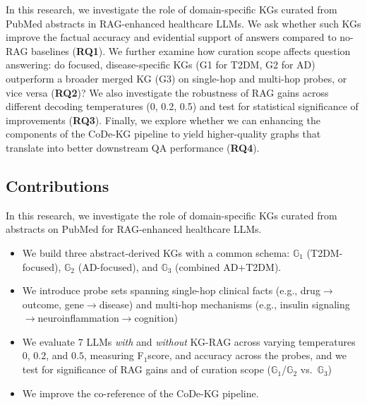 In this research, we investigate the role of domain-specific KGs curated from PubMed abstracts in RAG-enhanced healthcare LLMs. We ask whether such KGs improve the factual accuracy and evidential support of answers compared to no-RAG baselines (\textbf{RQ1}). We further examine how curation scope affects question answering: do focused, disease-specific KGs (G1 for T2DM, G2 for AD) outperform a broader merged KG (G3) on single-hop and multi-hop probes, or vice versa (\textbf{RQ2})? We also investigate the robustness of RAG gains across different decoding temperatures (0, 0.2, 0.5) and test for statistical significance of improvements (\textbf{RQ3}). Finally, we explore whether we can enhancing the components of the CoDe-KG pipeline to yield higher-quality graphs that translate into better downstream QA performance (\textbf{RQ4}).


% 

\subsection{Contributions}
In this research, we investigate the role of domain-specific KGs curated from abstracts on PubMed for RAG-enhanced healthcare LLMs. 
\begin{itemize}
    \item We build three abstract-derived KGs with a common schema: \textbf{$\mathbb{G}_1$} (T2DM-focused), \textbf{$\mathbb{G}_2$} (AD-focused), and \textbf{$\mathbb{G}_3$} (combined AD+T2DM).
   \item We introduce probe sets spanning single-hop clinical facts (e.g., drug$\rightarrow$outcome, gene$\rightarrow$disease) and multi-hop mechanisms (e.g., insulin signaling$\rightarrow$neuroinflammation$\rightarrow$cognition)
   \item We evaluate 7 LLMs \emph{with} and \emph{without} KG-RAG across varying temperatures $0$, $0.2$, and $0.5$, measuring F$_1$score, and accuracy across the probes, and we test for significance of RAG gains and of curation scope ($\mathbb{G}_1$/$\mathbb{G}_2$ vs.\ $\mathbb{G}_3$)
   \item We improve the co-reference of the CoDe-KG pipeline.
\end{itemize}









